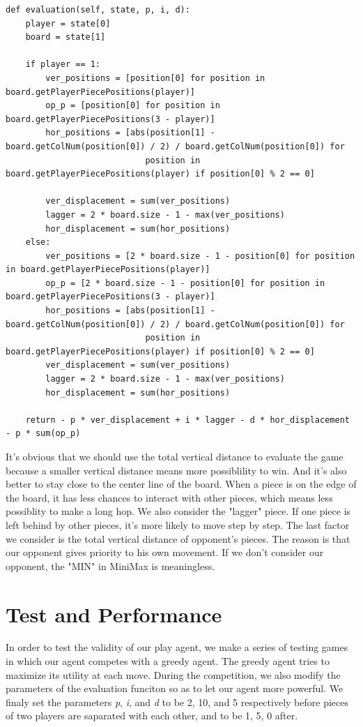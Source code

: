 \documentclass[aps,letterpaper,10pt]{article}
\begin{document}
\begin{lstlisting}[style = python]
def evaluation(self, state, p, i, d):
	player = state[0]
	board = state[1]

	if player == 1:
		ver_positions = [position[0] for position in board.getPlayerPiecePositions(player)]
		op_p = [position[0] for position in board.getPlayerPiecePositions(3 - player)]
		hor_positions = [abs(position[1] - board.getColNum(position[0]) / 2) / board.getColNum(position[0]) for
							position in board.getPlayerPiecePositions(player) if position[0] % 2 == 0]

		ver_displacement = sum(ver_positions)
		lagger = 2 * board.size - 1 - max(ver_positions)
		hor_displacement = sum(hor_positions)
	else:
		ver_positions = [2 * board.size - 1 - position[0] for position in board.getPlayerPiecePositions(player)]
		op_p = [2 * board.size - 1 - position[0] for position in board.getPlayerPiecePositions(3 - player)]
		hor_positions = [abs(position[1] - board.getColNum(position[0]) / 2) / board.getColNum(position[0]) for
							position in board.getPlayerPiecePositions(player) if position[0] % 2 == 0]
		ver_displacement = sum(ver_positions)
		lagger = 2 * board.size - 1 - max(ver_positions)
		hor_displacement = sum(hor_positions)

	return - p * ver_displacement + i * lagger - d * hor_displacement - p * sum(op_p)
\end{lstlisting}

It's obvious that we should use the total vertical distance to evaluate the game because a smaller vertical distance means more possiblility to win.
And it's also better to stay close to the center line of the board. 
When a piece is on the edge of the board, it has less chances to interact with other pieces,
which means less possiblity to make a long hop.
We also consider the "lagger" piece. If one piece is left behind by other pieces, it's more likely to move step by step.
The last factor we consider is the total vertical distance of opponent's pieces. 
The reason is that our opponent gives priority to his own movement. 
If we don't consider our opponent, the "MIN" in MiniMax is meaningless.

\section{Test and Performance}
In order to test the validity of our play agent, we make a series of testing games in which our agent competes with a greedy agent. The greedy agent tries to maximize its utility at each move. During the competition, we also modify the parameters of the evaluation funciton so as to let our agent more powerful. We finaly set the parameters {\itshape p}, {\itshape i}, and {\itshape d} to be 2, 10, and 5 respectively before pieces of two players are saparated with each other, and to be 1, 5, 0 after. 
\end{document}
